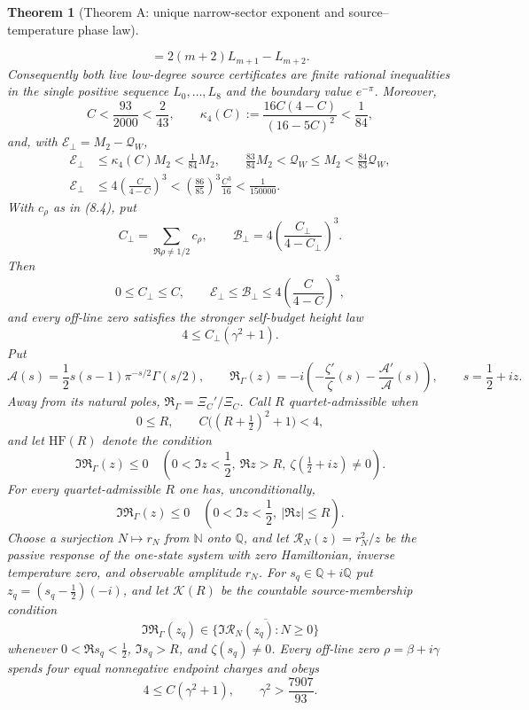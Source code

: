 \documentclass[11pt]{article}
\newtheorem{theorem}{Theorem}[section]
\begin{document}
\begin{theorem}[Theorem A: unique narrow-sector exponent and source--temperature phase law]
\begin{enumerate}[label=\textup{(\roman*)}]
\[ =2(m+2)L_{m+1}-L_{m+2}.                       \tag{1.18c}
\]
Consequently both live low-degree source certificates are finite rational inequalities in the
single positive sequence $L_0,\ldots,L_8$ and the boundary value $e^{-\pi}$.
Moreover,
\[
 C<\frac{93}{2000}<\frac2{43},\qquad
 \kappa_4(C):=\frac{16C(4-C)}{(16-5C)^2}<\frac1{84},
 \tag{1.19}
\]
and, with $\mathcal E_\perp=M_2-\mathcal Q_W$,
\[
 \begin{aligned}
 \mathcal E_\perp&\le\kappa_4(C)M_2<\frac1{84}M_2,\qquad
 \frac{83}{84}M_2<\mathcal Q_W\le M_2
 <\frac{84}{83}\mathcal Q_W,\\
 \mathcal E_\perp
 &\le4\left(\frac{C}{4-C}\right)^3
 <\left(\frac{86}{85}\right)^3\frac{C^3}{16}
 <\frac1{150000}.
 \end{aligned}
 \tag{1.20}
\]
With \(c_\rho\) as in \textup{(8.4)}, put
\[
 C_\perp=\sum_{\Re\rho\ne1/2}c_\rho,\qquad
 \mathcal B_\perp=
 4\left(\frac{C_\perp}{4-C_\perp}\right)^3.
 \tag{1.20aa}
\]
Then
\[
 0\le C_\perp\le C,\qquad
 \mathcal E_\perp\le\mathcal B_\perp
 \le4\left(\frac{C}{4-C}\right)^3,
 \tag{1.20ab}
\]
and every off-line zero satisfies the stronger self-budget height law
\[
 4\le C_\perp(\gamma^2+1).
 \tag{1.20ac}
\]
Put
\[
 \mathcal A(s)=\frac12s(s-1)\pi^{-s/2}\Gamma(s/2),\qquad
 \mathfrak R_\Gamma(z)=
 -i\left(-\frac{\zeta'}{\zeta}(s)-\frac{\mathcal A'}{\mathcal A}(s)\right),
 \qquad s=\frac12+iz.
\]
Away from its natural poles, $\mathfrak R_\Gamma=\Xi_C'/\Xi_C$.  Call $R$ quartet-admissible
when
\[
 0\le R,\qquad C\bigl((R+\tfrac12)^2+1\bigr)<4,
 \tag{1.20a}
\]
and let $\mathrm{HF}(R)$ denote the condition
\[
 \Im\mathfrak R_\Gamma(z)\le0
 \quad\left(0<\Im z<\frac12,\ \Re z>R,\ \zeta(\tfrac12+iz)\ne0\right).
 \tag{1.20b}
\]
For every quartet-admissible $R$ one has, unconditionally,
\[
 \Im\mathfrak R_\Gamma(z)\le0
 \quad\left(0<\Im z<\frac12,\ |\Re z|\le R\right).
 \tag{1.20c}
\]
Choose a surjection $N\mapsto r_N$ from $\mathbb N$ onto $\mathbb Q$, and let
\(\mathcal R_N(z)=r_N^2/z\) be the passive response of the one-state system with zero
Hamiltonian, inverse temperature zero, and observable amplitude $r_N$.  For
\(s_q\in\mathbb Q+i\mathbb Q\) put \(z_q=(s_q-\frac12)(-i)\), and let
\(\mathcal K(R)\) be the countable source-membership condition
\[
 \Im\mathfrak R_\Gamma(z_q)\in
 \overline{\{\Im\mathcal R_N(z_q):N\ge0\}}
 \tag{1.20ca}
\]
whenever \(0<\Re s_q<\frac12\), \(\Im s_q>R\), and \(\zeta(s_q)\ne0\).
Every off-line zero $\rho=\beta+i\gamma$ spends four equal nonnegative endpoint charges and obeys
\[
 4\le C(\gamma^2+1),\qquad \gamma^2>\frac{7907}{93}.
 \tag{1.20d}
\]
\end{enumerate}
\end{theorem}
\end{document}
